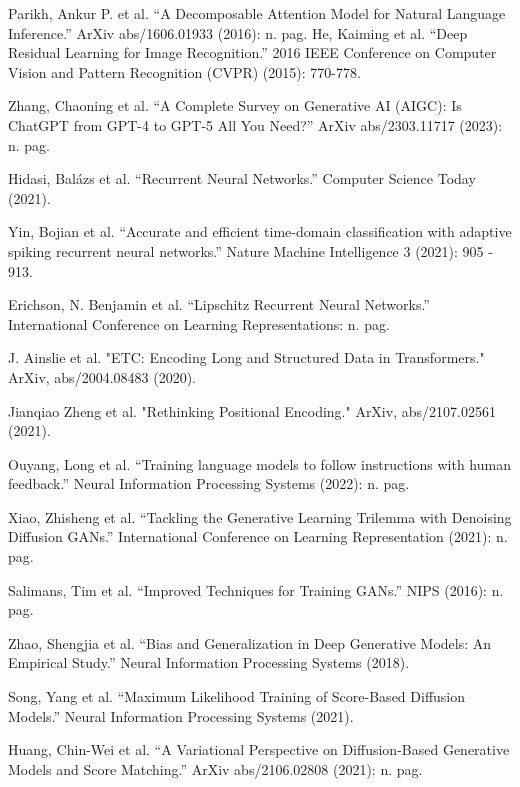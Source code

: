 \documentclass[preprint,12pt,authoryear]{elsarticle}
\begin{document}
\begin{thebibliography}{00}
Parikh, Ankur P. et al. “A Decomposable Attention Model for Natural Language Inference.” ArXiv abs/1606.01933 (2016): n. pag.
He, Kaiming et al. “Deep Residual Learning for Image Recognition.” 2016 IEEE Conference on Computer Vision and Pattern Recognition (CVPR) (2015): 770-778.

Zhang, Chaoning et al. “A Complete Survey on Generative AI (AIGC): Is ChatGPT from GPT-4 to GPT-5 All You Need?” ArXiv abs/2303.11717 (2023): n. pag.

Hidasi, Balázs et al. “Recurrent Neural Networks.” Computer Science Today (2021).

Yin, Bojian et al. “Accurate and efficient time-domain classification with adaptive spiking recurrent neural networks.” Nature Machine Intelligence 3 (2021): 905 - 913.

Erichson, N. Benjamin et al. “Lipschitz Recurrent Neural Networks.” International Conference on Learning Representations: n. pag.

J. Ainslie et al. "ETC: Encoding Long and Structured Data in Transformers." ArXiv, abs/2004.08483 (2020).

Jianqiao Zheng et al. "Rethinking Positional Encoding." ArXiv, abs/2107.02561 (2021).

Ouyang, Long et al. “Training language models to follow instructions with human feedback.” Neural Information Processing Systems (2022): n. pag.

Xiao, Zhisheng et al. “Tackling the Generative Learning Trilemma with Denoising Diffusion GANs.” International Conference on Learning Representation (2021): n. pag.

Salimans, Tim et al. “Improved Techniques for Training GANs.” NIPS (2016): n. pag.

Zhao, Shengjia et al. “Bias and Generalization in Deep Generative Models: An Empirical Study.” Neural Information Processing Systems (2018).

Song, Yang et al. “Maximum Likelihood Training of Score-Based Diffusion Models.” Neural Information Processing Systems (2021).

Huang, Chin-Wei et al. “A Variational Perspective on Diffusion-Based Generative Models and Score Matching.” ArXiv abs/2106.02808 (2021): n. pag.


\end{thebibliography}
\end{document}
